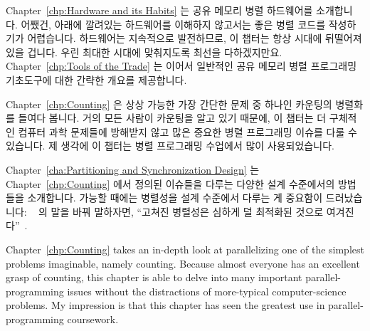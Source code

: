 Chapter~\ref{chp:Hardware and its Habits} 는 공유 메모리 병렬 하드웨어를
소개합니다.
어쨌건, 아래에 깔려있는 하드웨어를 이해하지 않고서는 좋은 병렬 코드를
작성하기가 어렵습니다.
하드웨어는 지속적으로 발전하므로, 이 챕터는 항상 시대에 뒤떨어져 있을 겁니다.
우린 최대한 시대에 맞춰지도록 최선을 다하겠지만요.
Chapter~\ref{chp:Tools of the Trade} 는 이어서 일반적인 공유 메모리 병렬
프로그래밍 기초도구에 대한 간략한 개요를 제공합니다.

\iffalse

This book is a handbook of widely applicable and heavily
used design techniques, rather than
a collection of optimal algorithms with tiny areas of applicability.
You are currently reading Chapter~\ref{chp:How To Use This Book}, but
you knew that already.
Chapter~\ref{chp:Introduction} gives a high-level overview of parallel
programming.

Chapter~\ref{chp:Hardware and its Habits} introduces shared-memory
parallel hardware.
After all, it is difficult to write good parallel code unless you
understand the underlying hardware.
Because hardware constantly evolves, this chapter will always be
out of date.
We will nevertheless do our best to keep up.
Chapter~\ref{chp:Tools of the Trade} then provides a very brief overview
of common shared-memory parallel-programming primitives.

\fi

Chapter~\ref{chp:Counting} 은 상상 가능한 가장 간단한 문제 중 하나인 카운팅의
병렬화를 들여다 봅니다.
거의 모든 사람이 카운팅을 알고 있기 때문에, 이 챕터는 더 구체적인 컴퓨터 과학
문제들에 방해받지 않고 많은 중요한 병렬 프로그래밍 이슈를 다룰 수 있습니다.
제 생각에 이 챕터는 병렬 프로그래밍 수업에서 많이 사용되었습니다.

Chapter~\ref{cha:Partitioning and Synchronization Design}
는 Chapter~\ref{chp:Counting} 에서 정의된 이슈들을 다루는 다양한 설계
수준에서의 방법들을 소개합니다.
가능할 때에는 병렬성을 설계 수준에서 다루는 게 중요함이 드러났습니다:
~\cite{Dijkstra:1968:LEG:362929.362947} 의 말을
바꿔 말하자면, ``고쳐진 병렬성은 심하게 덜 최적화된 것으로
여겨진다''~\cite{PaulEMcKenney2012HOTPARsuboptimal}.

\iffalse

Chapter~\ref{chp:Counting} takes an in-depth look at parallelizing
one of the simplest problems imaginable, namely counting.
Because almost everyone has an excellent grasp of counting, this chapter
is able to delve into many important parallel-programming issues without
the distractions of more-typical computer-science problems.
My impression is that this chapter has seen the greatest use in
parallel-programming coursework.

